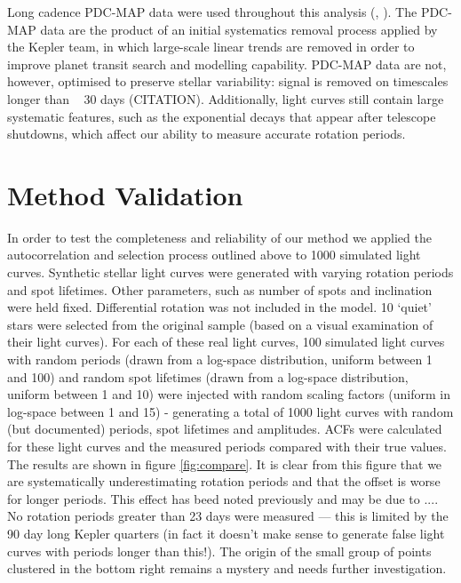 \documentclass[12pt,preprint]{aastex}
\begin{document}
Long cadence PDC-MAP data were used throughout this analysis (\citet{Smith_2012}, \citet{Stumpe_2012}). 
The PDC-MAP data are the product of an initial systematics removal process applied by the Kepler team,
 in which large-scale linear trends are removed in order to improve planet transit search and
modelling capability. 
PDC-MAP data are not, however, optimised to preserve stellar
variability: signal is removed on timescales longer than ~ 30 days (CITATION).
Additionally, light curves still contain large systematic features,
such as the exponential decays that appear after telescope shutdowns, which affect our
ability to measure accurate rotation periods. 

\section{Method Validation}
\label{method_validation}

In order to test the completeness and reliability of our method we applied the autocorrelation and selection process outlined above to 1000 simulated light curves. 
Synthetic stellar light curves were generated with varying rotation periods and spot lifetimes. 
Other parameters, such as number of spots and inclination were held fixed. Differential rotation was not included in the model. 
10 `quiet' stars were selected from the original sample (based on a visual examination of their light curves). For each of these real light curves, 100 simulated light curves with random periods (drawn from a log-space distribution, uniform between 1 and 100) and random spot lifetimes (drawn from a log-space distribution, uniform between 1 and 10) were injected with random scaling factors (uniform in log-space between 1 and 15) - generating a total of 1000 light curves with random (but documented) periods, spot lifetimes and amplitudes.
ACFs were calculated for these light curves and the measured periods compared with their true values. 
The results are shown in figure \ref{fig:compare}. It is clear from this figure that we are systematically underestimating rotation periods and that the offset is worse for longer periods. 
This effect has beed noted previously and may be due to .... 
No rotation periods greater than 23 days were measured --- this is limited by the 90 day long Kepler quarters (in fact it doesn't make sense to generate false light curves with periods longer than this!). 
The origin of the small group of points clustered in the bottom right remains a mystery and needs further investigation.
\end{document}
